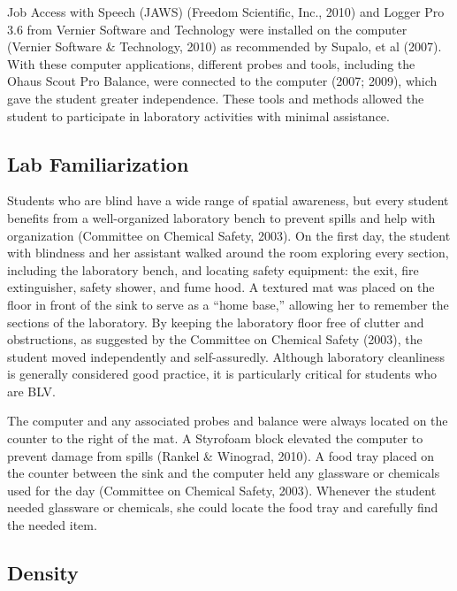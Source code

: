 \documentclass[11.5pt]{sig-alternate} %
\begin{document}
\begin{large}
Job Access with Speech (JAWS) (Freedom Scientific, Inc., 2010) and Logger Pro 3.6 from Vernier Software and Technology were installed on the computer (Vernier Software \& Technology, 2010) as recommended by Supalo, et al (2007). With these computer applications, different probes and tools, including the Ohaus Scout Pro Balance, were connected to the computer (2007; 2009), which gave the student greater independence. These tools and methods allowed the student to participate in laboratory activities with minimal assistance. 

\subsection*{Lab Familiarization}

Students who are blind have a wide range of spatial awareness, but every student benefits from a well-organized laboratory bench to prevent spills and help with organization (Committee on Chemical Safety, 2003). On the first day, the student with blindness and her assistant walked around the room exploring every section, including the laboratory bench, and locating safety equipment: the exit, fire extinguisher, safety shower, and fume hood. A textured mat was placed on the floor in front of the sink to serve as a “home base,” allowing her to remember the sections of the laboratory. By keeping the laboratory floor free of clutter and obstructions, as suggested by the Committee on Chemical Safety (2003), the student moved independently and self-assuredly. Although laboratory cleanliness is generally considered good practice, it is particularly critical for students who are BLV. 

The computer and any associated probes and balance were always located on the counter to the right of the mat. A Styrofoam block elevated the computer to prevent damage from spills (Rankel \& Winograd, 2010). A food tray placed on the counter between the sink and the computer held any glassware or chemicals used for the day (Committee on Chemical Safety, 2003). Whenever the student needed glassware or chemicals, she could locate the food tray and carefully find the needed item. 

\subsection*{Density}


\end{large}
\end{document}
